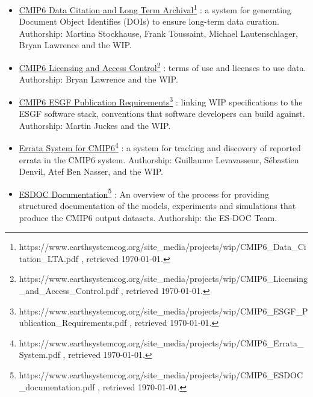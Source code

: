 \documentclass[gmd,manuscript]{copernicus}
\begin{document}
\begin{itemize}
{    , retrieved \today.} : systems for ensuring data compliance with
  rules and conventions listed above. Authorship: Frank Toussaint,
  Martina Stockhause, Michael Lautenschlager and the WIP.
\item
  \href{https://www.earthsystemcog.org/site_media/projects/wip/CMIP6_Data_Citation_LTA.pdf
  }{CMIP6 Data Citation and Long Term
    Archival}\footnote{https://www.earthsystemcog.org/site\_media/projects/wip/CMIP6\_Data\_Citation\_LTA.pdf
    , retrieved \today.} : a system for generating Document Object
  Identifies (DOIs) to ensure long-term data curation. Authorship:
  Martina Stockhause, Frank Toussaint, Michael Lautenschlager, Bryan
  Lawrence and the WIP.
\item
  \href{https://www.earthsystemcog.org/site_media/projects/wip/CMIP6_Licensing_and_Access_Control.pdf
  }{CMIP6 Licensing and Access
    Control}\footnote{https://www.earthsystemcog.org/site\_media/projects/wip/CMIP6\_Licensing\_and\_Access\_Control.pdf
    , retrieved \today.} : terms of use and licenses to use data.
  Authorship: Bryan Lawrence and the WIP.
\item
  \href{https://www.earthsystemcog.org/site_media/projects/wip/CMIP6_ESGF_Publication_Requirements.pdf
  }{CMIP6 ESGF Publication
    Requirements}\footnote{https://www.earthsystemcog.org/site\_media/projects/wip/CMIP6\_ESGF\_Publication\_Requirements.pdf
    , retrieved \today.} : linking WIP specifications to the ESGF
  software stack, conventions that software developers can build
  against. Authorship: Martin Juckes and the WIP.
\item
  \href{https://www.earthsystemcog.org/site_media/projects/wip/CMIP6_Errata_System.pdf
  }{Errata System for
    CMIP6}\footnote{https://www.earthsystemcog.org/site\_media/projects/wip/CMIP6\_Errata\_System.pdf
    , retrieved \today.} : a system for tracking and discovery of
  reported errata in the CMIP6 system. Authorship: Guillaume
  Levavasseur, Sébastien Denvil, Atef Ben Nasser, and the WIP.
\item
  \href{https://www.earthsystemcog.org/site_media/projects/wip/CMIP6_ESDOC_documentation.pdf
  }{ESDOC
    Documentation}\footnote{https://www.earthsystemcog.org/site\_media/projects/wip/CMIP6\_ESDOC\_documentation.pdf
    , retrieved \today.} : An overview of the process for providing
  structured documentation of the models, experiments and simulations
  that produce the CMIP6 output datasets. Authorship: the ES-DOC Team.
\end{itemize}
\end{document}
